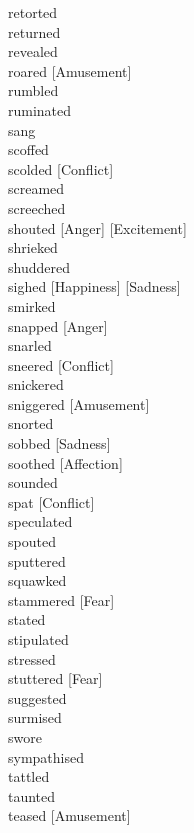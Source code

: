 retorted \hfill \\
returned \hfill \\
revealed \hfill \\
roared [Amusement] \hfill \\
rumbled \hfill \\
ruminated \hfill \\
sang \hfill \\
scoffed \hfill \\
scolded [Conflict] \hfill \\
screamed \hfill \\
screeched \hfill \\
shouted [Anger] [Excitement] \hfill \\
shrieked \hfill \\
shuddered \hfill \\
sighed [Happiness] [Sadness] \hfill \\
smirked \hfill \\
snapped [Anger] \hfill \\
snarled \hfill \\
sneered [Conflict] \hfill \\
snickered \hfill \\
sniggered [Amusement] \hfill \\
snorted \hfill \\
sobbed [Sadness] \hfill \\
soothed [Affection] \hfill \\
sounded \hfill \\
spat [Conflict] \hfill \\
speculated \hfill \\
spouted \hfill \\
sputtered \hfill \\
squawked \hfill \\
stammered [Fear] \hfill \\
stated \hfill \\
stipulated \hfill \\
stressed \hfill \\
stuttered [Fear] \hfill \\
suggested \hfill \\
surmised \hfill \\
swore \hfill \\
sympathised \hfill \\
tattled \hfill \\
taunted \hfill \\
teased [Amusement] \hfill \\

